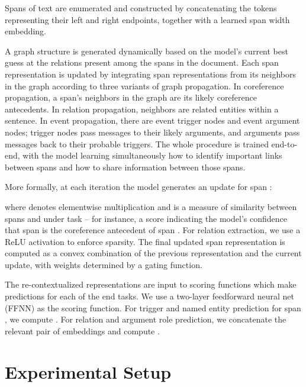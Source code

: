 \documentclass[11pt,a4paper]{article}
\begin{document}
\vspace{.1cm}
 Spans of text are enumerated and constructed by concatenating the tokens representing their left and right endpoints, together with a learned span width embedding.

\vspace{.1cm}
 A graph structure is generated dynamically based on the model's current best guess at the relations present among the spans in the document.
Each span representation  is updated by integrating   span representations from its neighbors in the graph according to three variants of graph propagation. In coreference propagation, a span's neighbors in the graph are its likely coreference antecedents.  In relation propagation, neighbors are related entities within a sentence. In event propagation, there are event trigger nodes and event argument nodes; trigger nodes pass messages to their likely arguments, and arguments pass messages back to their probable triggers. The whole procedure is trained end-to-end, with the model learning simultaneously how to identify important links between spans and how to share information between those spans.

More formally,  at each iteration  the model generates an update  for span :


\vspace{-0.5em}

\noindent where  denotes elementwise multiplication and  is a measure of similarity between spans  and  under task  -- for instance, a score indicating the model's confidence that span  is the coreference antecedent of span . For relation extraction, we use a ReLU activation  to enforce sparsity. The final updated span representation  is computed as a convex combination of the previous representation and the current update, with weights determined by a gating function.

\vspace{.1cm}
 The re-contextualized representations are input to scoring functions which make predictions for each of the end tasks. We use a two-layer feedforward neural net (FFNN) as the scoring function. For trigger and named entity prediction for span , we compute . For relation and argument role prediction, we concatenate the relevant pair of embeddings and compute .
 \vspace{-.1cm}
\section{Experimental Setup}
\end{document}
